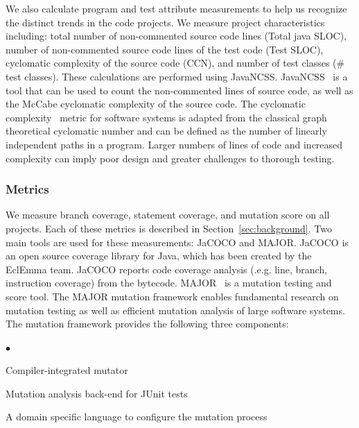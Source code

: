 \documentclass[conference]{IEEEtran}
\newcommand{\squishlist}{
 \begin{list}{$\bullet$}
  { \setlength{\itemsep}{0pt}
     \setlength{\parsep}{3pt}
     \setlength{\topsep}{3pt}
     \setlength{\partopsep}{0pt}
     \setlength{\leftmargin}{1.5em}
     \setlength{\labelwidth}{1em}
     \setlength{\labelsep}{0.5em} } }
\newcommand{\squishend}{
  \end{list}  }
\begin{document}
We also calculate program and test attribute measurements to help us recognize the distinct trends in the code projects. We measure project characteristics including: total number of non-commented source code lines (Total java SLOC), number of non-commented source code lines of the test code (Test SLOC), cyclomatic complexity of the source code (CCN), and number of test classes (\# test classes).
 These calculations are performed using JavaNCSS. JavaNCSS~\cite{leejavancss}  is a tool that can be used to count the non-commented lines of source code, as well as the McCabe cyclomatic complexity of the source code. The cyclomatic complexity~\cite{mccabe1976complexity} metric for software systems is adapted from the classical graph theoretical cyclomatic number and can be defined as the number of linearly independent paths in a program. Larger numbers of lines of code and increased complexity can imply poor design and greater challenges to thorough testing.

\subsubsection{Metrics}
We measure branch coverage, statement coverage, and mutation score on all projects.  Each of these metrics is described in Section~\ref{sec:background}.   Two main tools are used for these measurements: JaCOCO and MAJOR. JaCOCO \cite{hoffmann2007code} is an open source coverage library for Java, which has been created by the EclEmma team. JaCOCO reports code coverage analysis (.e.g. line, branch, instruction coverage) from the bytecode. MAJOR~\cite{just2011major} is a mutation testing and score tool.  The MAJOR mutation framework enables fundamental research on mutation testing as well as efficient mutation analysis of large software systems. The mutation framework provides the following three components:
\squishlist
\item Compiler-integrated mutator
\item Mutation analysis back-end for JUnit tests
\item A domain specific language to configure the mutation process
\squishend
       
\end{document}
